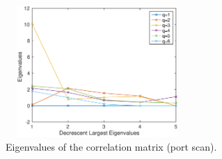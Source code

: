 \documentclass{bmcart}
\begin{document}
\begin{backmatter}
\begin{figure}[h!]
     \includegraphics[height=5cm, width=7cm]{results/figures/eigenvalues_portscan.eps}
     \caption{ Eigenvalues of the correlation matrix (port scan).}
     \label{fig:fig12}
\end{figure}



\end{backmatter}
\end{document}
